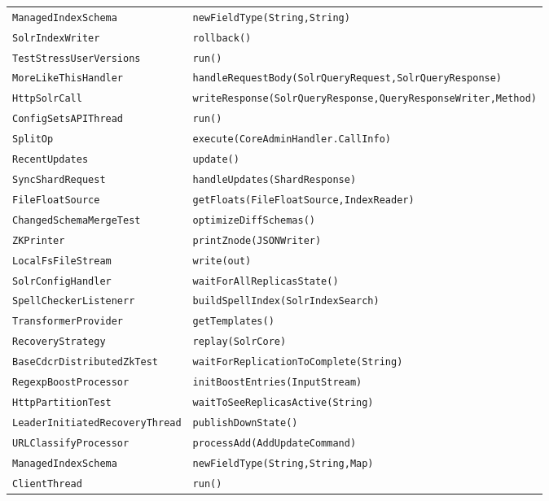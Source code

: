 \begin{center}
\begin{longtable}{ll}
\lstinline/ManagedIndexSchema/&{\lstinline/newFieldType(String,String)/}\\
\lstinline/SolrIndexWriter/&{\lstinline/rollback()/}\\
\lstinline/TestStressUserVersions/&{\lstinline/run()/}\\
\lstinline/MoreLikeThisHandler/&{\lstinline/handleRequestBody(SolrQueryRequest,SolrQueryResponse)/}\\
\lstinline/HttpSolrCall/&{\lstinline/writeResponse(SolrQueryResponse,QueryResponseWriter,Method)/}\\
\lstinline/ConfigSetsAPIThread/&{\lstinline/run()/}\\
\lstinline/SplitOp/&{\lstinline/execute(CoreAdminHandler.CallInfo)/}\\
\lstinline/RecentUpdates/&{\lstinline/update()/}\\
\lstinline/SyncShardRequest/&{\lstinline/handleUpdates(ShardResponse)/}\\
\lstinline/FileFloatSource/&{\lstinline/getFloats(FileFloatSource,IndexReader)/}\\
\lstinline/ChangedSchemaMergeTest/&{\lstinline/optimizeDiffSchemas()/}\\
\lstinline/ZKPrinter/&{\lstinline/printZnode(JSONWriter)/}\\
\lstinline/LocalFsFileStream/&{\lstinline/write(out)/}\\
\lstinline/SolrConfigHandler/&{\lstinline/waitForAllReplicasState()/}\\
\lstinline/SpellCheckerListenerr/&{\lstinline/buildSpellIndex(SolrIndexSearch)/}\\
\lstinline/TransformerProvider/&{\lstinline/getTemplates()/}\\
\lstinline/RecoveryStrategy/&{\lstinline/replay(SolrCore)/}\\
\lstinline/BaseCdcrDistributedZkTest/&{\lstinline/waitForReplicationToComplete(String)/}\\
\lstinline/RegexpBoostProcessor/&{\lstinline/initBoostEntries(InputStream)/}\\
\lstinline/HttpPartitionTest/&{\lstinline/waitToSeeReplicasActive(String)/}\\
\lstinline/LeaderInitiatedRecoveryThread/&{\lstinline/publishDownState()/}\\
\lstinline/URLClassifyProcessor/&{\lstinline/processAdd(AddUpdateCommand)/}\\
\lstinline/ManagedIndexSchema/&{\lstinline/newFieldType(String,String,Map)/}\\
\lstinline/ClientThread/&{\lstinline/run()/}\\

\end{longtable}
\end{center}
